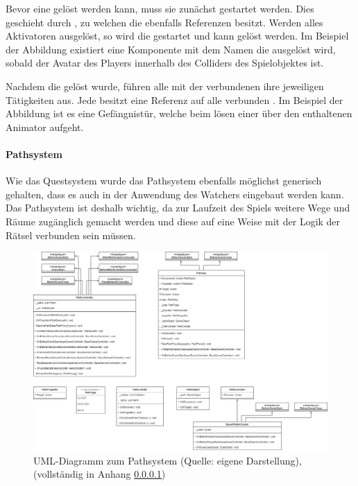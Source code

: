 Bevor eine  gelöst werden kann, muss sie zunächst gestartet werden. Dies geschieht durch , zu welchen die  ebenfalls Referenzen besitzt. Werden alles Aktivatoren ausgelöst, so wird die  gestartet und kann gelöst werden. Im Beispiel der Abbildung existiert eine Komponente mit dem Namen  die ausgelöst wird, sobald der Avatar des Players innerhalb des Colliders des Spielobjektes ist.

Nachdem die  gelöst wurde, führen alle mit der  verbundenen  ihre jeweiligen Tätigkeiten aus. Jede  besitzt eine Referenz auf alle verbunden . Im Beispiel der Abbildung ist es eine Gefängnistür, welche beim lösen einer  über den enthaltenen Animator aufgeht.

\paragraph{Pathsystem}
Wie das Questsystem wurde das Pathsystem ebenfalls möglichst generisch gehalten, dass es auch in der Anwendung des Watchers eingebaut werden kann. Das Pathsystem ist deshalb wichtig, da zur Laufzeit des Spiels weitere Wege und Räume zugänglich gemacht werden und diese auf eine Weise mit der Logik der Rätsel verbunden sein müssen.

\begin{figure}[ht]
\centering
\includegraphics[width=1\linewidth]{content/pictures/PathSystem.drawio.png}
\caption{UML-Diagramm zum Pathsystem (Quelle: eigene Darstellung), (vollständig in Anhang \ref{})}
\label{fig:path-system-uml}
\end{figure}

